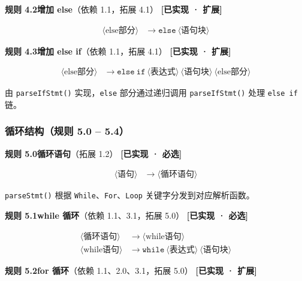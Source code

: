 \documentclass[12pt,a4paper]{ctexart}
\begin{document}
\textbf{规则 4.2\quad 增加 else}（依赖 1.1，拓展 4.1） \hfill \textcolor{green!60!black}{\textbf{[已实现 · 扩展]}}

\begin{align}
\langle\text{else部分}\rangle &\rightarrow \texttt{else} \ \langle\text{语句块}\rangle
\end{align}

\textbf{规则 4.3\quad 增加 else if}（依赖 1.1，拓展 4.1） \hfill \textcolor{green!60!black}{\textbf{[已实现 · 扩展]}}

\begin{align}
\langle\text{else部分}\rangle &\rightarrow \texttt{else} \ \texttt{if} \ \langle\text{表达式}\rangle \ \langle\text{语句块}\rangle \ \langle\text{else部分}\rangle
\end{align}

由 \texttt{parseIfStmt()} 实现，\texttt{else} 部分通过递归调用 \texttt{parseIfStmt()} 处理 \texttt{else if} 链。

\subsubsection{循环结构（规则 5.0 -- 5.4）}

\textbf{规则 5.0\quad 循环语句}（拓展 1.2） \hfill \textcolor{green!60!black}{\textbf{[已实现 · 必选]}}

\begin{align}
\langle\text{语句}\rangle &\rightarrow \langle\text{循环语句}\rangle
\end{align}

\texttt{parseStmt()} 根据 \texttt{While}、\texttt{For}、\texttt{Loop} 关键字分发到对应解析函数。

\textbf{规则 5.1\quad while 循环}（依赖 1.1、3.1，拓展 5.0） \hfill \textcolor{green!60!black}{\textbf{[已实现 · 必选]}}

\begin{align}
\langle\text{循环语句}\rangle &\rightarrow \langle\text{while语句}\rangle \\
\langle\text{while语句}\rangle &\rightarrow \texttt{while} \ \langle\text{表达式}\rangle \ \langle\text{语句块}\rangle
\end{align}

\textbf{规则 5.2\quad for 循环}（依赖 1.1、2.0、3.1，拓展 5.0） \hfill \textcolor{green!60!black}{\textbf{[已实现 · 扩展]}}
\end{document}
